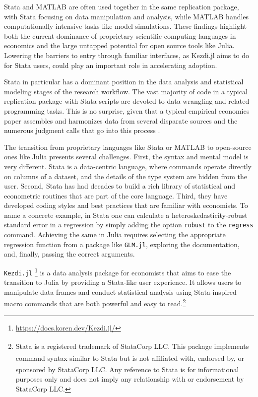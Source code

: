 \documentclass{juliacon}
\begin{document}
Stata and MATLAB are often used together in the same replication package, with Stata focusing on data manipulation and analysis, while MATLAB handles computationally intensive tasks like model simulations. These findings highlight both the current dominance of proprietary scientific computing languages in economics and the large untapped potential for open source tools like Julia. Lowering the barriers to entry through familiar interfaces, as Kezdi.jl aims to do for Stata users, could play an important role in accelerating adoption.

Stata in particular has a dominant position in the data analysis and statistical modeling stages of the research workflow. The vast majority of code in a typical replication package with Stata scripts are devoted to data wrangling and related programming tasks. This is no surprise, given that a typical empirical economics paper assembles and harmonizes data from several disparate sources and the numerous judgment calls that go into this process \cite{huntington2021influence}.

The transition from proprietary languages like Stata or MATLAB to open-source ones like Julia presents several challenges. First, the syntax and mental model is very different. Stata is a data-centric language, where commands operate directly on columns of a dataset, and the details of the type system are hidden from the user. Second, Stata has had decades to build a rich library of statistical and econometric routines that are part of the core language. Third, they have developed coding styles and best practices that are familiar with economists. To name a concrete example, in Stata one can calculate a heteroskedasticity-robust standard error in a regression by simply adding the option \texttt{robust} to the \texttt{regress} command. Achieving the same in Julia requires selecting the appropriate regression function from a package like \texttt{GLM.jl}, exploring the documentation, and, finally, passing the correct arguments.

\texttt{Kezdi.jl} \footnote{\url{https://docs.koren.dev/Kezdi.jl/}} is a data analysis package for economists that aims to ease the transition to Julia by providing a Stata-like user experience. It allows users to manipulate data frames and conduct statistical analysis using Stata-inspired macro commands that are both powerful and easy to read.\footnote{Stata\textsuperscript{\textregistered} is a registered trademark of StataCorp LLC. This package implements command syntax similar to Stata\textsuperscript{\textregistered} but is not affiliated with, endorsed by, or sponsored by StataCorp LLC. Any reference to Stata\textsuperscript{\textregistered} is for informational purposes only and does not imply any relationship with or endorsement by StataCorp LLC.}
\end{document}
